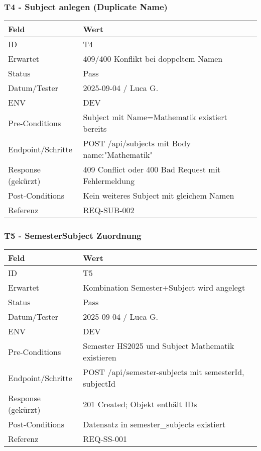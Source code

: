 \documentclass[12pt,a4paper]{article}
\begin{document}
    \subsubsection{T4 - Subject anlegen (Duplicate Name)}
    {\small
        \begin{tabularx}{\textwidth}{|p{3.2cm}|X|}
            \hline
            \textbf{Feld} & \textbf{Wert} \\ \hline
            ID & T4 \\ \hline
            Erwartet & 409/400 Konflikt bei doppeltem Namen \\ \hline
            Status & Pass \\ \hline
            Datum/Tester & 2025-09-04 / Luca G. \\ \hline
            ENV & DEV \\ \hline
            Pre-Conditions & Subject mit Name=Mathematik existiert bereits \\ \hline
            Endpoint/Schritte & POST /api/subjects mit Body {name:"Mathematik"} \\ \hline
            Response (gekürzt) & 409 Conflict oder 400 Bad Request mit Fehlermeldung \\ \hline
            Post-Conditions & Kein weiteres Subject mit gleichem Namen \\ \hline
            Referenz & REQ-SUB-002 \\ \hline
        \end{tabularx}
    }

    \subsubsection{T5 - SemesterSubject Zuordnung}
    {\small
        \begin{tabularx}{\textwidth}{|p{3.2cm}|X|}
            \hline
            \textbf{Feld} & \textbf{Wert} \\ \hline
            ID & T5 \\ \hline
            Erwartet & Kombination Semester+Subject wird angelegt \\ \hline
            Status & Pass \\ \hline
            Datum/Tester & 2025-09-04 / Luca G. \\ \hline
            ENV & DEV \\ \hline
            Pre-Conditions & Semester HS2025 und Subject Mathematik existieren \\ \hline
            Endpoint/Schritte & POST /api/semester-subjects mit {semesterId, subjectId} \\ \hline
            Response (gekürzt) & 201 Created; Objekt enth\"alt IDs \\ \hline
            Post-Conditions & Datensatz in semester_subjects existiert \\ \hline
            Referenz & REQ-SS-001 \\ \hline
        \end{tabularx}
    }
\end{document}
